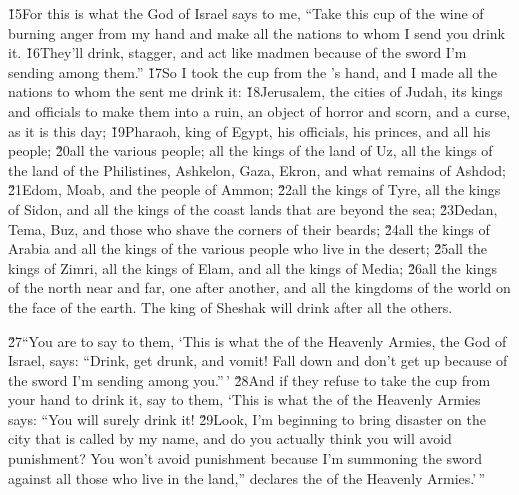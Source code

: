 \v{15}For this is what the  God of Israel says to me, ``Take this cup of the wine of burning anger from my hand and make all the nations to whom I send you drink it. \v{16}They'll drink, stagger, and act like madmen because of the sword I'm sending among them.'' \v{17}So I took the cup from the 's hand, and I made all the nations to whom the  sent me drink it: \v{18}Jerusalem, the cities of Judah, its kings and officials to make them into a ruin, an object of horror and scorn, and a curse, as it is this day; \v{19}Pharaoh, king of Egypt, his officials, his princes, and all his people; \v{20}all the various people; all the kings of the land of Uz, all the kings of the land of the Philistines, Ashkelon, Gaza, Ekron, and what remains of Ashdod; \v{21}Edom, Moab, and the people of Ammon; \v{22}all the kings of Tyre, all the kings of Sidon, and all the kings of the coast lands that are beyond the sea; \v{23}Dedan, Tema, Buz, and those who shave the corners of their beards; \v{24}all the kings of Arabia and all the kings of the various people who live in the desert; \v{25}all the kings of Zimri, all the kings of Elam, and all the kings of Media; \v{26}all the kings of the north near and far, one after another, and all the kingdoms of the world on the face of the earth. The king of Sheshak will drink after all the others.

\v{27}``You are to say to them, `This is what the  of the Heavenly Armies, the God of Israel, says: ``Drink, get drunk, and vomit! Fall down and don't get up because of the sword I'm sending among you.''\,' \v{28}And if they refuse to take the cup from your hand to drink it, say to them, `This is what the  of the Heavenly Armies says: ``You will surely drink it! \v{29}Look, I'm beginning to bring disaster on the city that is called by my name, and do you actually think you will avoid punishment? You won't avoid punishment because I'm summoning the sword against all those who live in the land,'' declares the  of the Heavenly Armies.'\,''

